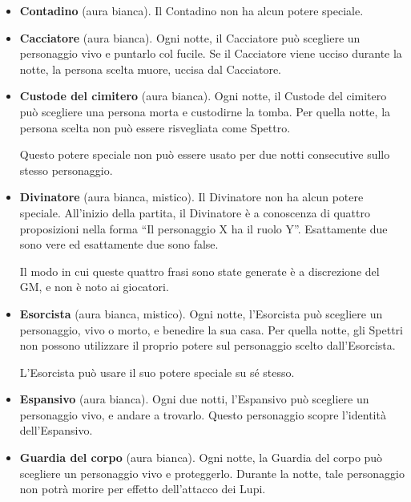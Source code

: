 \documentclass[a4paper,10pt]{article}
\begin{document}
\begin{itemize}
 \item {\bf Contadino} (aura bianca). Il Contadino non ha alcun potere speciale.

 \item {\bf Cacciatore} (aura bianca). Ogni notte, il Cacciatore può scegliere un personaggio vivo e puntarlo col fucile. Se il Cacciatore viene ucciso durante la notte, la persona scelta muore, uccisa dal Cacciatore.
 
 \item {\bf Custode del cimitero} (aura bianca). Ogni notte, il Custode del cimitero può scegliere una persona morta e custodirne la tomba. Per quella notte, la persona scelta non può essere risvegliata come Spettro.
 
 Questo potere speciale non può essere usato per due notti consecutive sullo stesso personaggio.

 \item {\bf Divinatore} (aura bianca, mistico). Il Divinatore non ha alcun potere speciale. All'inizio della partita, il Divinatore è a conoscenza di quattro proposizioni nella forma ``Il personaggio X ha il ruolo Y''. Esattamente due sono vere ed esattamente due sono false.
 
 Il modo in cui queste quattro frasi sono state generate è a discrezione del GM, e non è noto ai giocatori.

 \item {\bf Esorcista} (aura bianca, mistico). Ogni notte, l'Esorcista può scegliere un personaggio, vivo o morto, e benedire la sua casa.
 Per quella notte, gli Spettri non possono utilizzare il proprio potere sul personaggio scelto dall'Esorcista.
 
 L'Esorcista può usare il suo potere speciale su sé stesso.
 
 \item {\bf Espansivo} (aura bianca). Ogni due notti, l'Espansivo può scegliere un personaggio vivo, e andare a trovarlo. Questo personaggio scopre l'identità dell'Espansivo.

 \item {\bf Guardia del corpo} (aura bianca). Ogni notte, la Guardia del corpo può scegliere un personaggio vivo e proteggerlo. Durante la notte, tale personaggio non potrà morire per effetto dell'attacco dei Lupi.
 

\end{itemize}
\end{document}
